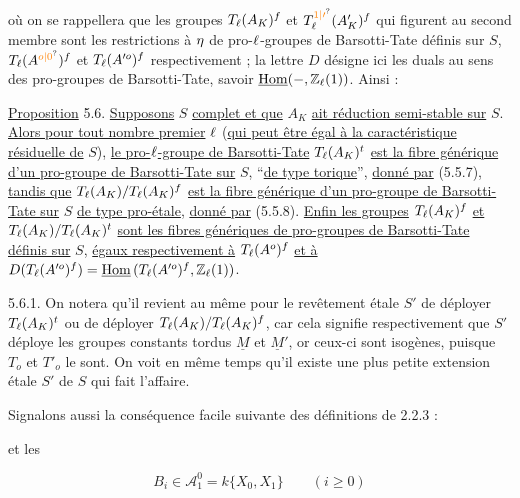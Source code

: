 où on se rappellera que les groupes $T_{\ell}(A_K)^f$ et $T_{\handwritten{\ell}}^{\unsure{1|\prime}}(A'_K)^f$ qui figurent au second membre sont les restrictions à $\eta$ de pro-$\ell$-groupes de Barsotti-Tate définis sur $S$, $T_{\handwritten{\ell}}(A^{\unsure{o|0}})^f$ et $T_{\ell}(A^{\prime o})^f$ respectivement ; la lettre $D$ désigne ici les duals au sens des pro-groupes de Barsotti-Tate, savoir $\underline{\mathrm{Hom}}(-,\mathbb{Z}_{\ell}(1))$. Ainsi :

\uline{Proposition} 5.6. \uline{Supposons} $S$ \uline{complet et que} $A_K$ \uline{ait réduction semi-stable sur} $S$. \uline{Alors pour tout nombre premier} $\ell$ (\uline{qui peut être égal à la caractéristique résiduelle de} $S$), \uline{le pro-}$\ell$\uline{-groupe de Barsotti-Tate} $T_{\ell}(A_K)^t$ \uline{est la fibre générique d'un pro-groupe de Barsotti-Tate sur} $S$, ``\uline{de type torique}'', \uline{donné par} (5.5.7), \uline{tandis que} $T_{\ell}(A_K)/T_{\ell}(A_K)^f$ \uline{est la fibre générique d'un pro-groupe de Barsotti-Tate sur} $S$ \uline{de type pro-étale}, \uline{donné par} (5.5.8). \uline{Enfin les groupes} $T_{\ell}(A_K)^f$ \uline{et} $T_{\ell}(A_K)/T_{\ell}(A_K)^t$ \uline{sont les fibres génériques de pro-groupes de Barsotti-Tate définis sur} $S$, \uline{égaux respectivement à} $T_{\ell}(A^o)^f$ \uline{et à} $D(T_{\ell}(A^{\prime o})^f)=\underline{\mathrm{Hom}}\,(T_{\ell}(A^{\prime o})^f,\mathbb{Z}_{\ell}(1))$.

5.6.1. On notera qu'il revient au même pour le revêtement étale $S'$ de déployer $T_{\ell}(A_K)^t$ ou de déployer $T_{\ell}(A_K)/T_{\ell}(A_K)^f$, car cela signifie respectivement que $S'$ déploye les groupes constants tordus $\underline{M}$ et $\underline{M}'$, or ceux-ci sont isogènes, puisque $T_o$ et $T'_o$ le sont. On voit en même temps qu'il existe une plus petite extension étale $S'$ de $S$ qui fait l'affaire.

Signalons aussi la conséquence facile suivante des définitions de 2.2.3 :



et les

\[
\boxed{B_i\in\mathcal A_1^0=k\{X_0,X_1\}\qquad (i\geq0)}
\]

